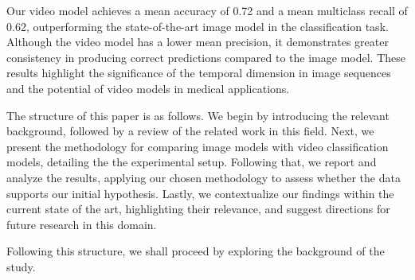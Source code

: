 Our video model achieves a mean accuracy of 0.72 and a mean multiclass recall of 0.62, outperforming the state-of-the-art image model in the classification task. Although the video model has a lower mean precision, it demonstrates greater consistency in producing correct predictions compared to the image model. These results highlight the significance of the temporal dimension in image sequences and the potential of video models in medical applications.


The structure of this paper is as follows. We begin by introducing the relevant background, followed by a review of the related work in this field. Next, we present the methodology for comparing image models with video classification models, detailing the the experimental setup. Following that, we report and analyze the results, applying our chosen methodology to assess whether the data supports our initial hypothesis. Lastly, we contextualize our findings within the current state of the art, highlighting their relevance, and suggest directions for future research in this domain.

Following this structure, we shall proceed by exploring the background of the study.